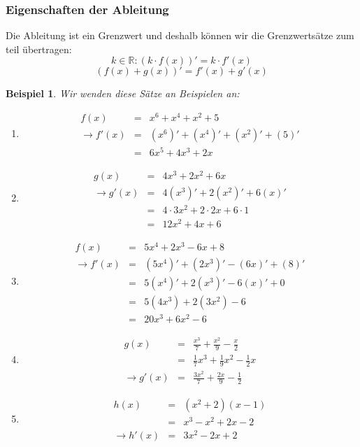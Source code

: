 \documentclass[a4paper,10pt]{report}
\newtheorem{myexample}{Beispiel}
\begin{document}
\subsubsection{Eigenschaften der Ableitung}
Die Ableitung ist ein Grenzwert und deshalb können wir die Grenzwertsätze zum teil übertragen:
\begin{equation*}k \in \mathbb{R}: (k \cdot f(x))' = k \cdot f'(x)\end{equation*}
\begin{equation*}(f(x) + g(x))' = f'(x) + g'(x)\end{equation*}
\begin{myexample}Wir wenden diese Sätze an Beispielen an:
\begin{enumerate}
\item
\begin{eqnarray*}
	f(x)&=& x^6 + x^4 + x^2 + 5\\
	\to f'(x) &=&  (x^6)'+(x^4)'+(x^2)'+(5)'\\
	 &=& 6x^5 + 4x^3 + 2x 
\end{eqnarray*}
\item
\begin{eqnarray*}
	g(x) &=& 4x^3 + 2x^2 + 6x\\
	\to g'(x) &=& 4(x^3)' + 2(x^2)' + 6(x)'\\
	&=& 4 \cdot 3x^2 + 2 \cdot 2x +6 \cdot 1\\
	&=& 12x^2 + 4x + 6
\end{eqnarray*}
\item 
\begin{eqnarray*}
f(x) & = & 5x^4 + 2x^3 - 6x + 8 \nonumber \\
\to f'(x) & = & (5x^4)' + (2x^3)' - (6x)' + (8)' \nonumber \\
& = & 5(x^4)' + 2(x^3)' - 6(x)' + 0 \nonumber \\
& = & 5(4x^3) + 2(3x^2) - 6 \nonumber \\
& = & 20x^3 + 6x^2 - 6
\end{eqnarray*}
\item \begin{eqnarray}g(x) & = & \frac{x^3}{7} + \frac{x^2}{9} - \frac{x}{2} \nonumber \\
& = & \frac{1}{7}x^3 + \frac{1}{9}x^2 - \frac{1}{2}x \nonumber \\
\to g'(x) & = & \frac{3x^2}{7} + \frac{2x}{9} - \frac{1}{2}\end{eqnarray}
\item
\begin{eqnarray*}
	h(x) &=& (x^2+2)(x-1)\\
	&=& x^3 -x^2 + 2x -2\\
	\to h'(x) &=& 3x^2 -2x + 2
\end{eqnarray*}
\end{enumerate}
\end{myexample}
\end{document}
